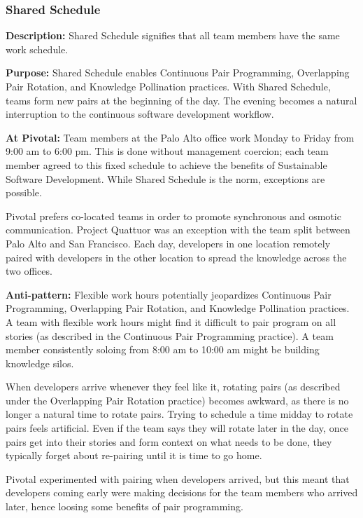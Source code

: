 \subsubsection{Shared Schedule}
\textbf{Description:} Shared Schedule signifies that all team members have the same work schedule. 

\textbf{Purpose:} Shared Schedule enables Continuous Pair Programming, Overlapping Pair Rotation, and Knowledge Pollination practices. With Shared Schedule, teams form new pairs at the beginning of the day. The evening becomes a natural interruption to the continuous software development workflow. 

\textbf{At Pivotal:} Team members at the Palo Alto office work Monday to Friday from 9:00 am to 6:00 pm. This is done without management coercion; each team member agreed to this fixed schedule to achieve the benefits of Sustainable Software Development. While Shared Schedule is the norm, exceptions are possible. 

Pivotal prefers co-located teams in order to promote synchronous and osmotic communication. Project Quattuor was an exception with the team split between Palo Alto and San Francisco. Each day, developers in one location remotely paired with developers in the other location to spread the knowledge across the two offices.

\textbf{Anti-pattern:} Flexible work hours potentially jeopardizes Continuous Pair Programming, Overlapping Pair Rotation, and Knowledge Pollination practices. A team with flexible work hours might find it difficult to pair program on all stories (as described in the Continuous Pair Programming practice). A team member consistently soloing from 8:00 am to 10:00 am might be building knowledge silos. 

When developers arrive whenever they feel like it, rotating pairs (as described under the Overlapping Pair Rotation practice) becomes awkward, as there is no longer a natural time to rotate pairs. Trying to schedule a time midday to rotate pairs feels artificial. Even if the team says they will rotate later in the day, once pairs get into their stories and form context on what needs to be done, they typically forget about re-pairing until it is time to go home.

Pivotal experimented with pairing when developers arrived, but this meant that developers coming early were making decisions for the team members who arrived later, hence loosing some benefits of pair programming. 

